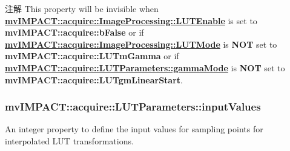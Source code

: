 \begin{DoxyNote}{注解}
This property will be invisible when {\bfseries \hyperlink{classmv_i_m_p_a_c_t_1_1acquire_1_1_image_processing_a7f8eb83578d97fde3405e6ae5d09e5c3}{mv\+I\+M\+P\+A\+C\+T\+::acquire\+::\+Image\+Processing\+::\+L\+U\+T\+Enable}} is set to {\bfseries mv\+I\+M\+P\+A\+C\+T\+::acquire\+::b\+False} or if {\bfseries \hyperlink{classmv_i_m_p_a_c_t_1_1acquire_1_1_image_processing_ae2f3059a3574e6a08a2d4348f1d5a152}{mv\+I\+M\+P\+A\+C\+T\+::acquire\+::\+Image\+Processing\+::\+L\+U\+T\+Mode}} is {\bfseries N\+O\+T} set to {\bfseries mv\+I\+M\+P\+A\+C\+T\+::acquire\+::\+L\+U\+Tm\+Gamma} or if {\bfseries \hyperlink{classmv_i_m_p_a_c_t_1_1acquire_1_1_l_u_t_parameters_aa9859adce405ea020bad38f40d779034}{mv\+I\+M\+P\+A\+C\+T\+::acquire\+::\+L\+U\+T\+Parameters\+::gamma\+Mode}} is {\bfseries N\+O\+T} set to {\bfseries mv\+I\+M\+P\+A\+C\+T\+::acquire\+::\+L\+U\+Tgm\+Linear\+Start}. 
\end{DoxyNote}
\hypertarget{classmv_i_m_p_a_c_t_1_1acquire_1_1_l_u_t_parameters_a819542e834bc096ca65bbcaa60084bb1}{
\subsubsection[{input\+Values}]{ mv\+I\+M\+P\+A\+C\+T\+::acquire\+::\+L\+U\+T\+Parameters\+::input\+Values}}\label{classmv_i_m_p_a_c_t_1_1acquire_1_1_l_u_t_parameters_a819542e834bc096ca65bbcaa60084bb1}


An integer property to define the input values for sampling points for interpolated L\+U\+T transformations. 


